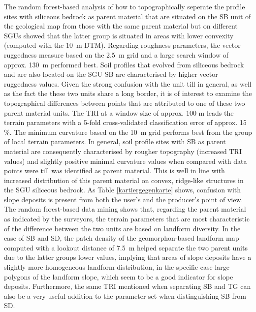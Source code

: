 \documentclass[preprint,12pt,authoryear]{elsarticle}
\begin{document}
The random forest-based analysis of how to topographically seperate the profile sites with siliceous bedrock as parent material that are situated on the SB unit of the geological map from those with the same parent material but on different SGUs showed that the latter group is situated in areas with lower convexity (computed with the 10~m DTM). Regarding roughness parameters, the vector ruggedness measure based on the 2.5~m grid and a large search window of approx. 130~m performed best. Soil profiles that evolved from siliceous bedrock and are also located on the SGU SB are characterised by higher vector ruggedness values. 
Given the strong confusion with the unit till in general, as well as the fact the these two units share a long border, it is of interest to examine the topographical differences between points that are attributed to one of these two parent material units. The TRI at a window size of approx. 100 m leads the terrain parameters with a 5-fold cross-validated classification error of approx. 15 \%. The minimum curvature based on the 10~m grid performs best from the group of local terrain parameters. In general, soil profile sites with SB as parent material are consequently characterised by rougher topography (increased TRI values) and slightly positive minimal curvature values when compared with data points were till was identified as parent material. This is well in line with increased distribution of this parent material on  convex, ridge-like structures in the SGU siliceous bedrock. As Table \ref{kartiergegenkarte} shows, confusion with slope deposits is present from both the user's and the producer's point of view. The random forest-based data mining shows that, regarding the parent material as indicated by the surveyors, the terrain parameters that are most characteristic of the difference between the two units are based on landform diversity. In the case of SB and SD, the patch density of the geomorphon-based landform map computed with a lookout distance of 7.5~m helped separate the two parent units due to the latter groups lower values, implying that areas of slope deposits have a slightly more homogeneous landform distribution, in the specific case large polygons of the landform slope, which seem to be a good indicator for slope deposits.  Furthermore, the same TRI mentioned when separating SB and TG can also be a very useful addition to the parameter set when distinguishing SB from SD. 
\end{document}
